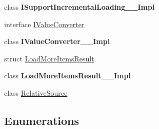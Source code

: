 \begin{DoxyCompactItemize}
\item 
class {\bfseries I\+Support\+Incremental\+Loading\+\_\+\+\_\+\+Impl}
\item 
interface \hyperlink{interface_windows_1_1_u_i_1_1_xaml_1_1_data_1_1_i_value_converter}{I\+Value\+Converter}
\item 
class {\bfseries I\+Value\+Converter\+\_\+\+\_\+\+Impl}
\item 
struct \hyperlink{struct_windows_1_1_u_i_1_1_xaml_1_1_data_1_1_load_more_items_result}{Load\+More\+Items\+Result}
\item 
class {\bfseries Load\+More\+Items\+Result\+\_\+\+\_\+\+Impl}
\item 
class \hyperlink{class_windows_1_1_u_i_1_1_xaml_1_1_data_1_1_relative_source}{Relative\+Source}
\end{DoxyCompactItemize}
\subsection*{Enumerations}
